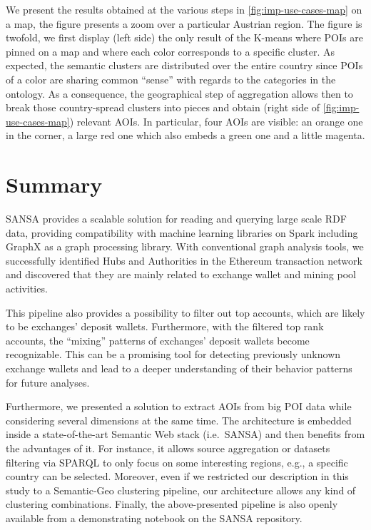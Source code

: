 We present the results obtained at the various steps in \autoref{fig:imp-use-cases-map} on a map, the figure presents a zoom over a particular Austrian region. The figure is twofold, we first display (left side) the only result of the K-means where POIs are pinned on a map and where each color corresponds to a specific cluster. As expected, the semantic clusters are distributed over the entire country since POIs of a color are sharing common ``sense'' with regards to the categories in the ontology. As a consequence, the geographical step of aggregation allows then to break those country-spread clusters into pieces and obtain (right side of \autoref{fig:imp-use-cases-map}) relevant AOIs. In particular, four AOIs are visible: an orange one in the corner, a large red one which also embeds a green one and a little magenta.


\section{Summary}
SANSA provides a scalable solution for reading and querying large scale RDF data, providing compatibility with machine learning libraries on Spark including GraphX as a graph processing library.
With conventional graph analysis tools, we successfully identified Hubs and Authorities in the Ethereum transaction network and discovered that they are mainly related to exchange wallet and mining pool activities.

This pipeline also provides a possibility to filter out top accounts, which are likely to be exchanges' deposit wallets. 
Furthermore, with the filtered top rank accounts, the ``mixing'' patterns of exchanges' deposit wallets become recognizable. 
This can be a promising tool for detecting previously unknown exchange wallets and lead to a deeper understanding of their behavior patterns for future analyses.

Furthermore, we presented a solution to extract AOIs from big POI data while considering several dimensions at the same time. The architecture is embedded inside a state-of-the-art Semantic Web stack (i.e.~SANSA) and then benefits from the advantages of it. For instance, it allows source aggregation or datasets filtering via SPARQL to only focus on some interesting regions, e.g., a specific country can be selected. 
Moreover, even if we restricted our description in this study to a Semantic-Geo clustering pipeline, our architecture allows any kind of clustering combinations.
Finally, the above-presented pipeline is also openly available from a demonstrating notebook on the SANSA repository.
